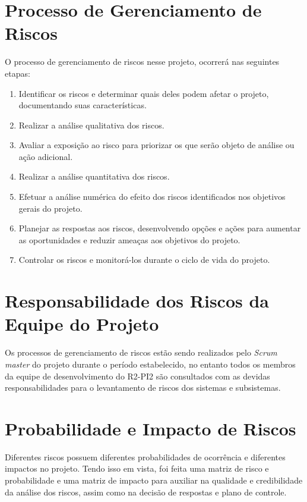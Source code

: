\section{Processo de Gerenciamento de Riscos} %
\label{sec:processo_de_gerenciamento_de_riscos}
	
	O processo de gerenciamento de riscos nesse projeto, ocorrerá nas seguintes etapas:
	\begin{enumerate}
		\item Identificar os riscos e determinar quais deles podem afetar o projeto, documentando suas características.
		\item Realizar a análise qualitativa dos riscos.
		\item Avaliar a exposição ao risco para priorizar os que serão objeto de análise ou ação adicional. 
		\item Realizar a análise quantitativa dos riscos.
		\item Efetuar a análise numérica do efeito dos riscos identificados nos objetivos gerais do projeto.
		\item Planejar as respostas aos riscos, desenvolvendo opções e ações para aumentar as oportunidades e reduzir ameaças aos objetivos do projeto.
		\item Controlar os riscos e monitorá-los durante o ciclo de vida do projeto.

	\end{enumerate}



\section{Responsabilidade dos Riscos da Equipe do Projeto} %
\label{sec:responsabilidade_dos_riscos_da_equipe_do_projeto}

Os processos de gerenciamento de riscos estão sendo realizados pelo \textit{Scrum master} do projeto durante o período estabelecido, no entanto todos os membros da equipe de desenvolvimento do R2-PI2 são consultados com as devidas responsabilidades para o levantamento de riscos dos sistemas e subsistemas.

\section{Probabilidade e Impacto de Riscos} %
 \label{sec:probabilidade_e_impacto_de_riscos}
 
 Diferentes riscos possuem diferentes probabilidades de ocorrência e diferentes impactos no projeto. Tendo isso em vista, foi feita uma matriz de risco e probabilidade e uma matriz de impacto para auxiliar na qualidade e credibilidade da análise dos riscos, assim como na decisão de respostas e plano de controle.

